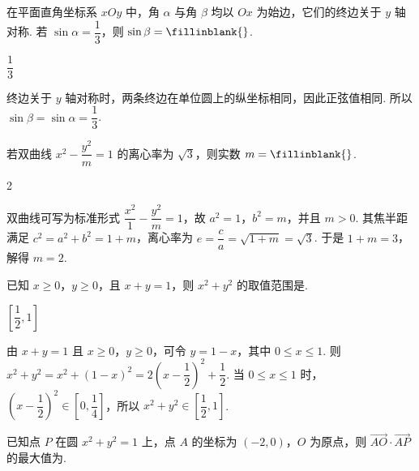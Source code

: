 \begin{problem}
在平面直角坐标系 \(xOy\) 中，角 \(\alpha\) 与角 \(\beta\) 均以 \(Ox\) 为始边，它们的终边关于 \(y\) 轴对称. 若 \(\sin\alpha=\dfrac13\)，则 \(\sin\beta=\fillinblank{}\).
\end{problem}

\begin{answer}
\(\dfrac13\)
\end{answer}

\begin{solution}
终边关于 \(y\) 轴对称时，两条终边在单位圆上的纵坐标相同，因此正弦值相同. 所以 \(\sin\beta=\sin\alpha=\dfrac13\).
\end{solution}

\begin{problem}
若双曲线 \(x^2-\dfrac{y^2}{m}=1\) 的离心率为 \(\sqrt3\)，则实数 \(m=\fillinblank{}\).
\end{problem}

\begin{answer}
2
\end{answer}

\begin{solution}
双曲线可写为标准形式 \(\dfrac{x^2}{1}-\dfrac{y^2}{m}=1\)，故 \(a^2=1\)，\(b^2=m\)，并且 \(m>0\). 其焦半距满足 \(c^2=a^2+b^2=1+m\)，离心率为
\(e=\dfrac ca=\sqrt{1+m}=\sqrt3\).
于是 \(1+m=3\)，解得 \(m=2\).
\end{solution}

\begin{problem}
已知 \(x\ge0\)，\(y\ge0\)，且 \(x+y=1\)，则 \(x^2+y^2\) 的取值范围是\fillinblank{}.
\end{problem}

\begin{answer}
\(\left[\dfrac12,1\right]\)
\end{answer}

\begin{solution}
由 \(x+y=1\) 且 \(x\ge0\)，\(y\ge0\)，可令 \(y=1-x\)，其中 \(0\le x\le1\). 则
\(x^2+y^2=x^2+(1-x)^2=2\left(x-\dfrac12\right)^2+\dfrac12\).
当 \(0\le x\le1\) 时，\(\left(x-\dfrac12\right)^2\in\left[0,\dfrac14\right]\)，所以 \(x^2+y^2\in\left[\dfrac12,1\right]\).
\end{solution}

\begin{problem}
已知点 \(P\) 在圆 \(x^2+y^2=1\) 上，点 \(A\) 的坐标为 \((-2,0)\)，\(O\) 为原点，则 \(\overrightarrow{AO}\cdot\overrightarrow{AP}\) 的最大值为\fillinblank{}.
\end{problem}

